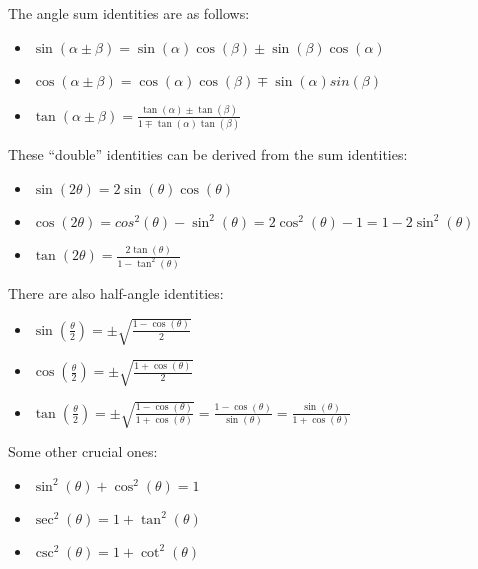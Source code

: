 \documentclass[12pt]{article}
\begin{document}
    \noindent The angle sum identities are as follows:
    \begin{itemize}
        \item \(\sin(\alpha\pm\beta)=\sin(\alpha)\cos(\beta)\pm\sin(\beta)\cos(\alpha)\)
        \item \(\cos(\alpha\pm\beta)=\cos(\alpha)\cos(\beta)\mp\sin(\alpha)sin(\beta)\)
        \item \(\tan(\alpha\pm\beta)=\frac{\tan(\alpha)\pm\tan(\beta)}{1\mp\tan(\alpha)\tan(\beta)}\)
    \end{itemize}

    \noindent These ``double'' identities can be derived from the sum identities:
    \begin{itemize}
        \item \(\sin(2\theta)=2\sin(\theta)\cos(\theta)\)
        \item \(\cos(2\theta)=cos^2(\theta)-\sin^2(\theta)=2\cos^2(\theta)-1=1-2\sin^2(\theta)\)
        \item \(\tan(2\theta)=\frac{2\tan(\theta)}{1-\tan^2(\theta)}\)
    \end{itemize}

    \noindent There are also half-angle identities:
    \begin{itemize}
        \item \(\sin(\frac{\theta}{2})=\pm\sqrt{\frac{1-\cos(\theta)}{2}}\)
        \item \(\cos(\frac{\theta}{2})=\pm\sqrt{\frac{1+\cos(\theta)}{2}}\)
        \item \(\tan(\frac{\theta}{2})=\pm\sqrt{\frac{1-\cos(\theta)}{1+\cos(\theta)}}=\frac{1-\cos(\theta)}{\sin(\theta)}=\frac{\sin(\theta)}{1+\cos(\theta)}\)
    \end{itemize}

    \noindent Some other crucial ones:
    \begin{itemize}
        \item \(\sin^2(\theta)+\cos^2(\theta)=1\)
        \item \(\sec^2(\theta)=1+\tan^2(\theta)\)
        \item \(\csc^2(\theta)=1+\cot^2(\theta)\)
    \end{itemize}
\end{document}
